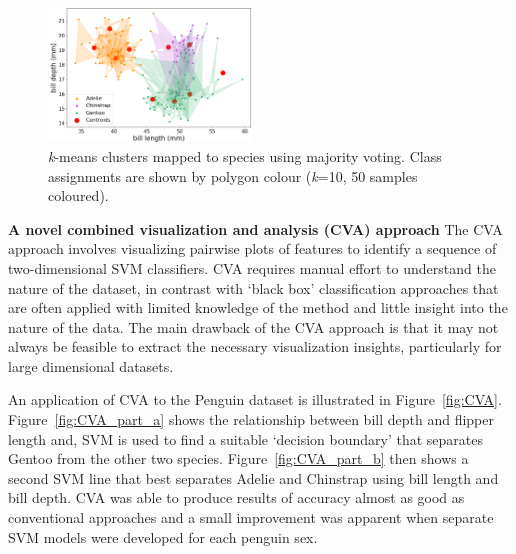 \documentclass[12pt]{article}
\begin{document}
\begin{figure} %
  \centering
  \vspace{-1\baselineskip} %
  \includegraphics[width=0.48\textwidth]{kmeansmap.png} %
  \vspace{-0.5\baselineskip} %
  \caption{\centering\linespread{0.8}\selectfont \textit{k}-means clusters mapped to species using majority voting. 
  Class assignments are shown by polygon colour (\textit{k}=10, 50 samples coloured).}
  \vspace{-0.5\baselineskip} %
  \label{fig:kmeansmap}
\end{figure}

\textbf{A novel combined visualization and analysis (CVA) approach}  
The CVA approach involves visualizing pairwise plots of features 
to identify a sequence of two-dimensional SVM classifiers. 
CVA requires manual effort to understand the nature of the dataset, 
in contrast with `black box' classification approaches that are often applied with limited knowledge 
of the method and little insight into the nature of the data. 
The main drawback of the CVA approach is that it may not always be feasible to extract the necessary visualization insights, 
particularly for large dimensional datasets. 

An application of CVA to the Penguin dataset is illustrated in Figure~\ref{fig:CVA}. 
Figure~\ref{fig:CVA_part_a} shows the relationship between bill depth and flipper length and, 
SVM is used to find a suitable `decision boundary' that separates Gentoo from the other two species. 
Figure~\ref{fig:CVA_part_b} then shows a second SVM line that best separates Adelie and Chinstrap using bill length and bill depth. 
CVA was able to produce results of accuracy almost as good as conventional approaches and a small improvement 
was apparent when separate SVM models were developed for each penguin sex.
\end{document}
